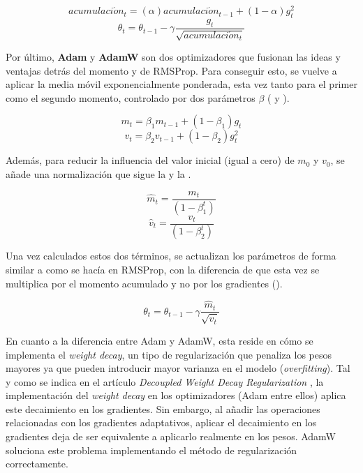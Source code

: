 \begin{equation}
\label{eqn:RMSProp}
acumulaci\acute{o}n_t = (\alpha) acumulaci\acute{o}n_{t-1} + (1-\alpha) g^{2}_{t}
\end{equation}
\begin{equation}
\label{eqn:RMSProp2}
\theta_t = \theta_{t-1} - \gamma \frac{g_t}{\sqrt{acumulaci\acute{o}n_t}}
\end{equation}

Por último, \textbf{Adam} y \textbf{AdamW} son dos optimizadores que fusionan las ideas y ventajas detrás del momento y de RMSProp. Para conseguir esto, se vuelve a aplicar la media móvil exponencialmente ponderada, esta vez tanto para el primer como el segundo momento, controlado por dos parámetros $\beta$ ( y ).

\begin{equation}
\label{eqn:Adam}
m_t = \beta_1 m_{t-1} + (1-\beta_1) g_{t}
\end{equation}
\begin{equation}
\label{eqn:Adam2}
v_t = \beta_2 v_{t-1} + (1-\beta_2) g^{2}_{t}
\end{equation}

Además, para reducir la influencia del valor inicial (igual a cero) de $m_0$ y $v_0$, se añade una normalización que sigue la  y la .

\begin{equation}
\label{eqn:Adam3}
\hat{m}_t = \frac{m_t}{(1-\beta^{t}_{1})}
\end{equation}
\begin{equation}
\label{eqn:Adam4}
\hat{v}_t = \frac{v_t}{(1-\beta^{t}_{2})}
\end{equation}

Una vez calculados estos dos términos, se actualizan los parámetros de forma similar a como se hacía en RMSProp, con la diferencia de que esta vez se multiplica por el momento acumulado y no por los gradientes ().

\begin{equation}
\label{eqn:Adam5}
\theta_t = \theta_{t-1} - \gamma \frac{\hat{m}_t}{\sqrt{\hat{v}_t}}
\end{equation}

En cuanto a la diferencia entre Adam y AdamW, esta reside en cómo se implementa el \textit{weight decay}, un tipo de regularización que penaliza los pesos mayores ya que pueden introducir mayor varianza en el modelo (\textit{overfitting}). Tal y como se indica en el artículo \textit{Decoupled Weight Decay Regularization} \cite{adamw}, la implementación del \textit{weight decay} en los optimizadores (Adam entre ellos) aplica este decaimiento en los gradientes. Sin embargo, al añadir las operaciones relacionadas con los gradientes adaptativos, aplicar el decaimiento en los gradientes deja de ser equivalente a aplicarlo realmente en los pesos. AdamW soluciona este problema implementando el método de regularización correctamente.

